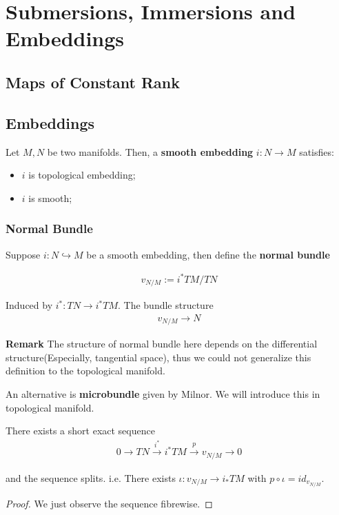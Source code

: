 \documentclass[Total.tex]{subfiles}
\begin{document}
	\chapter{Submersions, Immersions and Embeddings}
		\section{Maps of Constant Rank}
		\section{Embeddings}
			\begin{Def}
				Let $M,N$ be two manifolds. Then, a \textbf{smooth embedding} $i:N\rightarrow M$ satisfies:
				\begin{itemize}
					\item $i$ is topological embedding;
					\item $i$ is smooth;
				\end{itemize}
			\end{Def}
			\subsection{Normal Bundle}
				\begin{Def}
					Suppose $i:N\hookrightarrow M$ be a smooth embedding, then define the \textbf{normal bundle}
					
					\begin{gather*}
						v_{N/M}:=i^*TM/TN
					\end{gather*}
					
					Induced by $i^*:TN\rightarrow i^*TM$. The bundle structure
					\begin{gather*}
						v_{N/M}\rightarrow N
					\end{gather*}
				\end{Def}
				
				\textbf{Remark} The structure of normal bundle here depends on the differential structure(Especially, tangential space), thus we could not generalize this definition to the topological manifold. 
				
				An alternative is \textbf{microbundle} given by Milnor. We will introduce this in topological manifold.
				
				\begin{proposition}
					There exists a short exact sequence
					\begin{gather*}
						0\rightarrow TN\stackrel{i^*}{\rightarrow} i^* TM\stackrel{p}{\rightarrow}v_{N/M}\rightarrow 0
					\end{gather*}
					
					and the sequence splits. i.e. There exists $\iota:v_{N/M}\rightarrow i_*TM$ with $p\circ \iota=id_{v_{N/M}}$. 
				\end{proposition}
				\begin{proof}
					We just observe the sequence fibrewise. 
				\end{proof}
				
\end{document}
